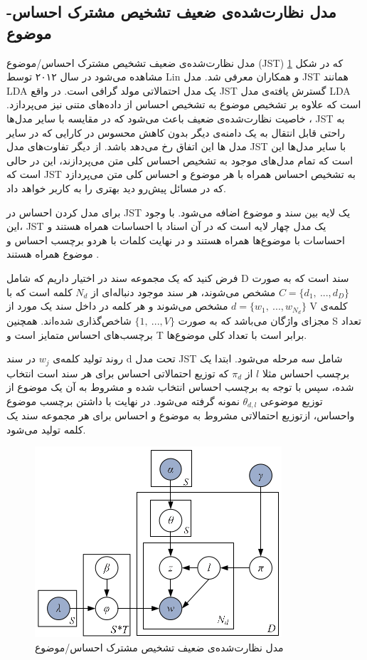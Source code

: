 	\subsection{مدل نظارت‌شده‌ی ضعیف تشخیص مشترک احساس-موضوع}
	\label{chap3sec4sub1}
مدل نظارت‌شده‌ی ضعیف تشخیص مشترک احساس/موضوع
(JST) \cite{lin2012weakly}
 که در شکل 
\ref{chap3-fig8}
مشاهده می‌‌شود در سال ۲۰۱۲ توسط
 Lin
 و همکاران معرفی‌ شد. مدل
 JST
  همانند 
 LDA
 یک مدل احتمالاتی مولد گرافی است. در واقع
 JST
 گسترش یافته‌ی‌ مدل 
 LDA
 است که علاوه بر تشخیص موضوع به تشخیص احساس از داده‌های متنی نیز می‌پردازد.  خاصیت نظارت‌شده‌ی ضعیف باعث می‌‌شود که در مقایسه با سایر مدل‌ها
 ، JST
  به راحتی‌ قابل انتقال به یک دامنه‌ی دیگر بدون کاهش محسوس در کارایی که در سایر مدل ها این اتفاق رخ می‌‌دهد باشد. از دیگر تفاوت‌های مدل
   JST
    با سایر مدل‌ها این است که تمام مدل‌های موجود به تشخیص احساس کلی‌ متن می‌پردازند، این در حالی‌ است که
     JST
      به تشخیص احساس همراه با هر موضوع و احساس کلی‌ متن می‌‌پردازد که در مسائل پیش‌رو دید بهتری را به کاربر خواهد داد.
 
  برای مدل کردن احساس در 
 JST
 یک لایه بین سند و موضوع اضافه می‌شود. با وجود این، 
 JST
 یک مدل چهار لایه است که در آن اسناد با احساسات همراه هستند و احساسات با موضوع‌ها همراه هستند و در نهایت کلمات با هردو برچسب احساس و موضوع همراه هستند
 \cite{lin2012weakly}.
 
  فرض کنید که یک مجموعه سند در اختیار داریم که شامل
  D
   سند است که به صورت  
  $C = \{d_1,\ ...,d_D\}$
   مشخص می‌‌شوند، هر سند موجود دنباله‌ای از  
  $N_d$
   کلمه است که با  
   $d=\{w_1,\ ...,w_{N_d} \}$
    مشخص می‌‌شوند و هر کلمه در داخل سند یک مورد از 
    V
    کلمه‌ی مجزای واژگان می‌باشد که به صورت 
    $\{1,\ ...,V\}$
    شاخص‌گذاری شده‌اند. همچنین 
    S
    تعداد برچسب‌های احساس متمایز است و 
    T
    برابر است با تعداد کلی‌ موضوع‌ها.
    
     روند تولید کلمه‌ی  
   $w_j$
    در سند 
    d
    تحت مدل 
    JST
    شامل سه‌ مرحله می‌‌شود. ابتدا یک برچسب احساس مثلا  
    $l$
    از  
    $\pi_d$
    که توزیع احتمالاتی احساس برای هر سند است انتخاب شده، سپس با توجه به برچسب احساس انتخاب شده و مشروط به آن یک موضوع از توزیع موضوعی 
    $\theta_{d,l}$
     نمونه گرفته می‌شود. در نهایت با داشتن برچسب موضوع واحساس، ازتوزیع احتمالاتی مشروط به موضوع و احساس برای هر مجموعه سند یک کلمه تولید می‌شود. 
   	\begin{figure}[!h]
   		\centering
   		\includegraphics[scale=0.5]{chap3-img/JST}
   		\caption{مدل نظارت‌شده‌ی ضعیف تشخیص مشترک احساس/موضوع \cite{lin2012weakly}}
   		\label{chap3-fig8}
   	\end{figure}
    
